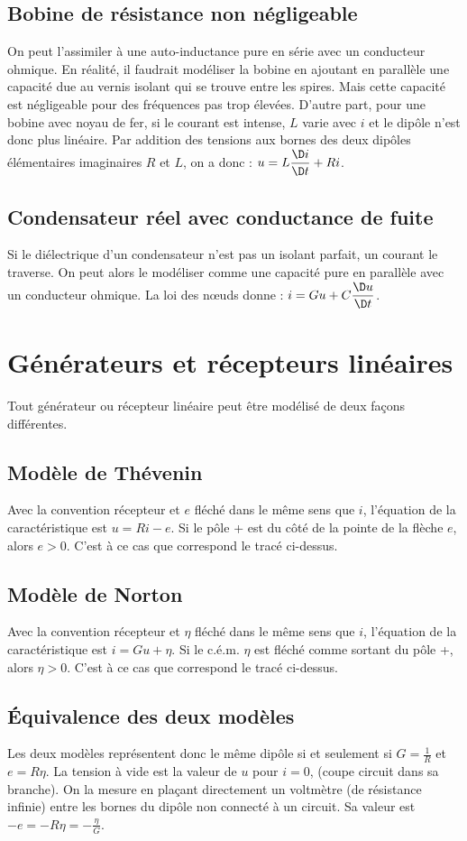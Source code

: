 \subsection{Bobine de résistance non négligeable}

On peut l'assimiler à une auto-inductance pure en série avec un conducteur ohmique. En réalité, il faudrait modéliser la bobine en ajoutant en parallèle une capacité due au vernis isolant qui se trouve entre les spires. Mais cette capacité est négligeable pour des fréquences pas trop élevées. D'autre part, pour une bobine avec noyau de fer, si le courant est intense, $L$ varie avec $i$ et le dipôle n'est donc plus linéaire. Par addition des tensions aux bornes des deux dipôles élémentaires imaginaires $R$ et $L$, on a donc : $u = L\derived{i}{t} + Ri$.

\subsection{Condensateur réel avec conductance de fuite}

Si le diélectrique d'un condensateur n'est pas un isolant parfait, un courant le traverse. On peut alors le modéliser comme une capacité pure en parallèle avec un conducteur ohmique.
La loi des nœuds donne : $i = Gu + C \derived{u}{t}$.

\section{Générateurs et récepteurs linéaires}
Tout générateur ou récepteur linéaire peut être modélisé de deux façons différentes.
\subsection{Modèle de Thévenin}
Avec la convention récepteur et $e$ fléché dans le même sens que $i$, l'équation de la caractéristique est $u=Ri-e$. Si le pôle + est du côté de la pointe de la flèche $e$, alors $e > 0$. C'est à ce cas que correspond le tracé ci-dessus.
\subsection{Modèle de Norton}
Avec la convention récepteur et $\eta$ fléché dans le même sens que $i$, l'équation de la caractéristique est $i=Gu+\eta$. Si le c.é.m. $\eta$ est fléché comme sortant du pôle +, alors $\eta > 0$. C'est à ce cas que correspond le tracé ci-dessus.
\subsection{Équivalence des deux modèles}
Les deux modèles représentent donc le même dipôle si et seulement si
$G=\frac{1}{R}$ et $e = R \eta$. La tension à vide est la valeur de $u$ pour $i =
0$, (coupe circuit dans sa branche).  On la mesure en plaçant directement un
voltmètre (de résistance infinie) entre les bornes du dipôle non connecté à un
circuit. Sa valeur est $-e = -R\eta = -\frac{\eta}{G}$.

